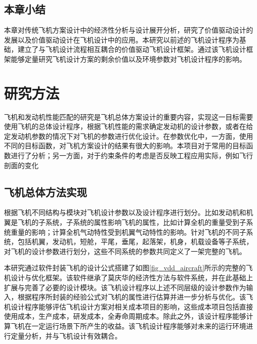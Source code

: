 \documentclass[12pt,a4paper]{report}
\begin{document}

\section{本章小结}
本章对传统飞机方案设计中的经济性分析与设计展开分析，研究了价值驱动设计的发展以及价值驱动设计在飞机设计中的应用。本研究以前述的飞机设计程序为基础，建立了与飞机设计流程相互耦合的价值驱动飞机设计框架。通过该飞机设计框架能够定量研究飞机设计方案的剩余价值以及环境参数对飞机设计程序的影响。


\chapter{研究方法}

飞机和发动机性能匹配的研究是飞机总体方案设计的重要内容，实现这一目标需要使用飞机的总体设计程序，根据飞机性能的需求确定发动机的设计参数，或者在给定发动机参数的情况下对飞机的参数进行优化设计。在参数优化中，一方面，使用不同的目标函数，对飞机方案设计的结果有很大的影响。本项目对于常用的目标函数进行了分析；另一方面，对于约束条件的考虑是否反映工程应用实际，例如飞行剖面的变化

\section{飞机总体方法实现}

根据飞机不同结构与模块对飞机设计参数以及设计程序进行划分。比如发动机和机翼是飞机的子系统，子系统的属性影响飞机的属性，比如计算全机的重量受到子系统重量的影响；计算全机气动特性受到机翼气动特性的影响。针对飞机的不同子系统，包括机翼，发动机，短舱，平尾，垂尾，起落架，机身，机载设备等子系统，对飞机的设计参数进行划分，这些不同系统的参数共同定义了一架完整的飞机。

本研究通过软件封装飞机的设计公式搭建了如图\ref{fig_vdd_aircraft}所示的完整的飞机设计与优化框架。该软件继承了莫庆华的经济性方法与软件系统，并在此基础上扩展与完善了必要的设计模块。该飞机设计程序以上述不同层级的设计参数作为输入，根据程序所封装的经验公式对飞机的属性进行估算并进一步分析与优化。该飞机设计程序能够评估飞机设计方案对相关成本项目的影响，这些成本项目包括直接使用成本，生产成本，研发成本，全寿命周期成本。除此之外，该设计程序能够计算飞机在一定运行场景下所产生的收益。该飞机设计程序能够对未来的运行环境进行定量分析，并与飞机设计有效耦合。
\end{document}
